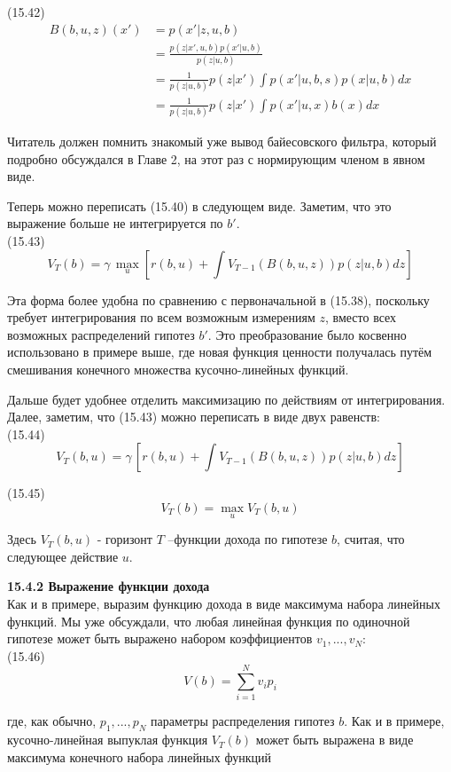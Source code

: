 \documentclass[10pt,a4paper]{article}
\begin{document}
(15.42)
\begin{equation*}
\begin{split}
B(b,u,z)(x')&=p(x'|z,u,b)\\
&=\frac{p(z|x',u,b)p(x'|u,b)}{p(z|u,b)}\\
&=\frac{1}{p(z|u,b)}p(z|x')\int p(x'|u,b,s)p(x|u,b)dx\\
&=\frac{1}{p(z|u,b)}p(z|x')\int p(x'|u,x)b(x)dx
\end{split}
\end{equation*}

Читатель должен помнить знакомый уже вывод байесовского фильтра, который подробно обсуждался в Главе 2, на этот раз с нормирующим членом в явном виде.

Теперь можно переписать (15.40) в следующем виде. Заметим, что это выражение больше не интегрируется по $b'$.\\

(15.43)
$$V_T(b)=\gamma\,\underset{u}{\max}\left[ r(b,u)+\int V_{T-1}(B(b,u,z))p(z|u,b)dz\right] $$

Эта форма более удобна по сравнению с первоначальной в (15.38), поскольку требует интегрирования по всем возможным измерениям $z$, вместо всех возможных распределений гипотез $b'$. Это преобразование было косвенно использовано в примере выше, где новая функция ценности получалась путём смешивания конечного множества кусочно-линейных функций.

Дальше будет удобнее отделить максимизацию по действиям от интегрирования. Далее, заметим, что (15.43) можно переписать в виде двух равенств:\\

(15.44)
$$V_T(b,u)=\gamma\,\left[ r(b,u)+\int V_{T-1}(B(b,u,z))p(z|u,b)dz\right] $$

(15.45)
$$V_T(b)=\underset{u}{\max}V_T(b,u)$$

Здесь $V_T (b, u)$ - горизонт $T$ –функции дохода по гипотезе $b$, считая, что следующее действие $u$.

\textbf{15.4.2	Выражение функции дохода}\\

Как и в примере, выразим функцию дохода в виде максимума набора линейных функций.  Мы уже обсуждали, что любая линейная функция по одиночной гипотезе может быть выражено набором коэффициентов $v_1,..., v_N$:\\

(15.46)
$$V(b)=\sum_{i=1}^N v_ip_i$$

где, как обычно, $p_1,..., p_N$ параметры распределения гипотез $b$. Как и в примере, кусочно-линейная выпуклая функция $V_T (b)$ может быть выражена в виде максимума конечного набора линейных функций\\
\end{document}

